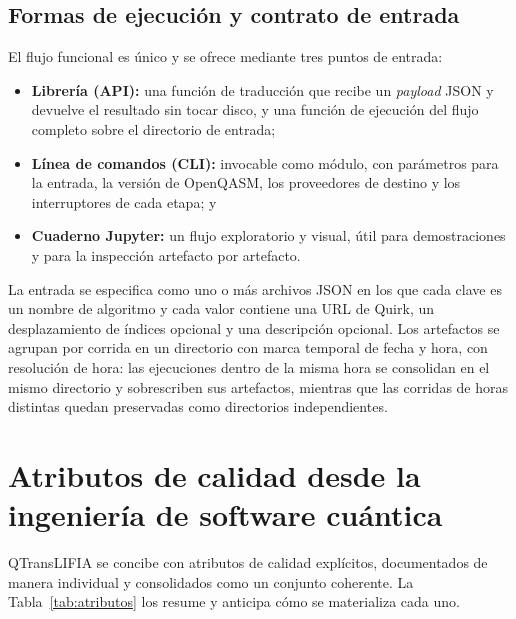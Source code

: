 \documentclass[11pt,a4paper]{article}
\begin{document}
\subsection{Formas de ejecución y contrato de entrada}

El flujo funcional es único y se ofrece mediante tres puntos de entrada:

\begin{itemize}[leftmargin=1.6em]
  \item \textbf{Librería (API):} una función de traducción que recibe un \emph{payload} JSON
        y devuelve el resultado sin tocar disco, y una función de ejecución del flujo
        completo sobre el directorio de entrada;
  \item \textbf{Línea de comandos (CLI):} invocable como módulo, con parámetros para la
        entrada, la versión de OpenQASM, los proveedores de destino y los interruptores de
        cada etapa; y
  \item \textbf{Cuaderno Jupyter:} un flujo exploratorio y visual, útil para demostraciones
        y para la inspección artefacto por artefacto.
\end{itemize}

La entrada se especifica como uno o más archivos JSON en los que cada clave es un nombre de
algoritmo y cada valor contiene una URL de Quirk, un desplazamiento de índices opcional y
una descripción opcional. Los artefactos se agrupan por corrida en un directorio con marca
temporal de fecha y hora, con resolución de hora: las ejecuciones dentro de la misma hora
se consolidan en el mismo directorio y sobrescriben sus artefactos, mientras que las
corridas de horas distintas quedan preservadas como directorios independientes.

\section{Atributos de calidad desde la ingeniería de software cuántica}
\label{sec:atributos}

QTransLIFIA se concibe con atributos de calidad explícitos, documentados de manera
individual y consolidados como un conjunto coherente. La Tabla~\ref{tab:atributos} los
resume y anticipa cómo se materializa cada uno.
\end{document}

